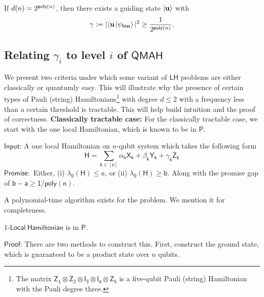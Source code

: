 \documentclass[11pt]{article}
\newcommand{\ms}[1]{\mathsf{#1}}
\begin{document}
\begin{coro}
    If $d(n)= 2^{\mathsf{poly}(n)}$, then there exists a guiding state $\ket{\mathbf{u}}$ with
    $$\gamma:=|\langle \mathbf{u} \ket{\psi_{\mathsf{hist}}}|^2 \geq \frac{1}{ 2^{\mathsf{poly}(n)} }.$$
\end{coro}




\subsection{Relating $\gamma_i$ to level $i$ of $\ms{QMAH}$ }
We present two criteria under which some variant of $\mathsf{LH}$ problems are either classically or quantumly easy. This will illustrate why the presence of certain types of Pauli (string) Hamiltonians\footnote{The matrix $\mathsf{Z_1\otimes Z_2 \otimes I_3 \otimes I_4 \otimes Z_5}$ is a five-qubit Pauli (string) Hamiltonian with the Pauli degree three.} with degree $d\leq 2$  with a frequency less than a certain threshold is tractable. This will help build intuition and the proof of correctness.\newline
\textbf{Classically tractable case:} For the classically tractable case, we start with the one local Hamiltonian, which is known to be in $\mathsf{P}$.
\begin{prob}
     $\mathsf{Input}$: A one local Hamiltonian on $n$-qubit system which takes the following form 
    \begin{equation}
        \mathsf{H= \sum_{k\in [n]}\alpha_k X_k +\beta_k Y_k + \gamma_k Z_k} 
    \end{equation}
    $\mathsf{Promise}:$ Either, (i) $\mathsf{\lambda_0(H)}\leq a$, or (ii) $\mathsf{\lambda_0(H)\geq b}$. Along with the promise gap of $\mathsf{b-a \geq 1/poly(n)}$. 
    \label{thm:z-ham} 
\end{prob}
A polynomial-time algorithm exists for the problem. We mention it for completeness.
\begin{theorem}
    $1$-$\mathsf{Local\ Hamiltonian}$ is in $\mathsf{P}$.
\end{theorem}
$\mathsf{Proof}$: There are two methods to construct this. First, construct the ground state, which is guaranteed to be a product state over $n$ qubits.
\end{document}
